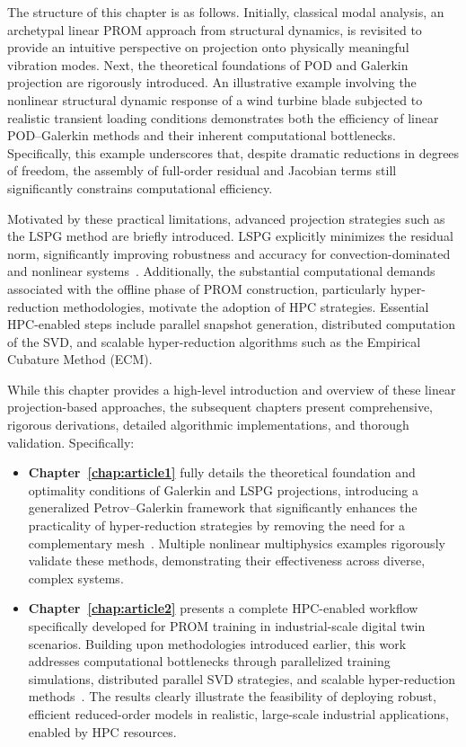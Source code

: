 The structure of this chapter is as follows. Initially, classical modal analysis, an archetypal linear PROM approach from structural dynamics, is revisited to provide an intuitive perspective on projection onto physically meaningful vibration modes. Next, the theoretical foundations of POD and Galerkin projection are rigorously introduced. An illustrative example involving the nonlinear structural dynamic response of a wind turbine blade subjected to realistic transient loading conditions demonstrates both the efficiency of linear POD–Galerkin methods and their inherent computational bottlenecks. Specifically, this example underscores that, despite dramatic reductions in degrees of freedom, the assembly of full-order residual and Jacobian terms still significantly constrains computational efficiency.

Motivated by these practical limitations, advanced projection strategies such as the LSPG method are briefly introduced. LSPG explicitly minimizes the residual norm, significantly improving robustness and accuracy for convection-dominated and nonlinear systems~\cite{carlberg2011efficient, carlberg2017galerkin}. Additionally, the substantial computational demands associated with the offline phase of PROM construction, particularly hyper-reduction methodologies, motivate the adoption of HPC strategies. Essential HPC-enabled steps include parallel snapshot generation, distributed computation of the SVD, and scalable hyper-reduction algorithms such as the Empirical Cubature Method (ECM).

While this chapter provides a high-level introduction and overview of these linear projection-based approaches, the subsequent chapters present comprehensive, rigorous derivations, detailed algorithmic implementations, and thorough validation. Specifically:

\begin{itemize}
    \item \textbf{Chapter~\ref{chap:article1}} fully details the theoretical foundation and optimality conditions of Galerkin and LSPG projections, introducing a generalized Petrov–Galerkin framework that significantly enhances the practicality of hyper-reduction strategies by removing the need for a complementary mesh~\cite{Ares2023}. Multiple nonlinear multiphysics examples rigorously validate these methods, demonstrating their effectiveness across diverse, complex systems.
    \item \textbf{Chapter~\ref{chap:article2}} presents a complete HPC-enabled workflow specifically developed for PROM training in industrial-scale digital twin scenarios. Building upon methodologies introduced earlier, this work addresses computational bottlenecks through parallelized training simulations, distributed parallel SVD strategies, and scalable hyper-reduction methods~\cite{Ares2024}. The results clearly illustrate the feasibility of deploying robust, efficient reduced-order models in realistic, large-scale industrial applications, enabled by HPC resources.
\end{itemize}

